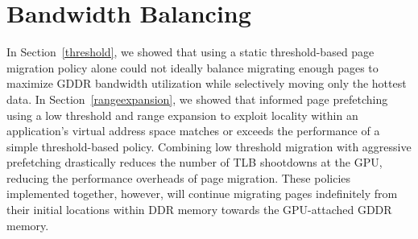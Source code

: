 \section{Bandwidth Balancing}
In Section~\ref{threshold}, we showed that using a static threshold-based page migration policy alone could
not ideally balance migrating enough pages to maximize GDDR bandwidth utilization while selectively moving
only the hottest data.  In Section~\ref{rangeexpansion}, we showed that informed page prefetching using
a low threshold and range expansion to exploit locality within an application's virtual address space matches or exceeds the performance of a simple threshold-based policy.  Combining low threshold migration with aggressive prefetching drastically
reduces the number of TLB shootdowns at the GPU, reducing the performance overheads of
page migration.  These policies implemented together, however, will continue migrating pages
indefinitely from their initial locations within DDR memory towards the GPU-attached GDDR memory.

